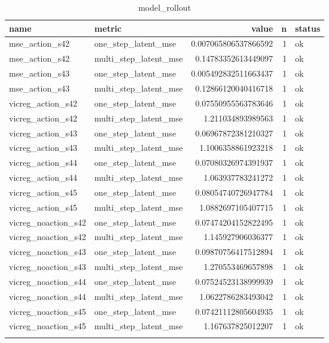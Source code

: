 \begin{table}
\centering
\begin{tabular}{llrrl}
name & metric & value & n & status \\
\hline
mse\_action\_s42 & one\_step\_latent\_mse & 0.007065806537866592 & 1 & ok \\
mse\_action\_s42 & multi\_step\_latent\_mse & 0.14783352613449097 & 1 & ok \\
mse\_action\_s43 & one\_step\_latent\_mse & 0.005492832511663437 & 1 & ok \\
mse\_action\_s43 & multi\_step\_latent\_mse & 0.12866120040416718 & 1 & ok \\
vicreg\_action\_s42 & one\_step\_latent\_mse & 0.07550955563783646 & 1 & ok \\
vicreg\_action\_s42 & multi\_step\_latent\_mse & 1.211034893989563 & 1 & ok \\
vicreg\_action\_s43 & one\_step\_latent\_mse & 0.06967872381210327 & 1 & ok \\
vicreg\_action\_s43 & multi\_step\_latent\_mse & 1.1006358861923218 & 1 & ok \\
vicreg\_action\_s44 & one\_step\_latent\_mse & 0.07080326974391937 & 1 & ok \\
vicreg\_action\_s44 & multi\_step\_latent\_mse & 1.063937783241272 & 1 & ok \\
vicreg\_action\_s45 & one\_step\_latent\_mse & 0.08054740726947784 & 1 & ok \\
vicreg\_action\_s45 & multi\_step\_latent\_mse & 1.0882697105407715 & 1 & ok \\
vicreg\_noaction\_s42 & one\_step\_latent\_mse & 0.07474204152822495 & 1 & ok \\
vicreg\_noaction\_s42 & multi\_step\_latent\_mse & 1.145927906036377 & 1 & ok \\
vicreg\_noaction\_s43 & one\_step\_latent\_mse & 0.09870756417512894 & 1 & ok \\
vicreg\_noaction\_s43 & multi\_step\_latent\_mse & 1.270553469657898 & 1 & ok \\
vicreg\_noaction\_s44 & one\_step\_latent\_mse & 0.07524523138999939 & 1 & ok \\
vicreg\_noaction\_s44 & multi\_step\_latent\_mse & 1.0622786283493042 & 1 & ok \\
vicreg\_noaction\_s45 & one\_step\_latent\_mse & 0.07421112805604935 & 1 & ok \\
vicreg\_noaction\_s45 & multi\_step\_latent\_mse & 1.167637825012207 & 1 & ok \\
\caption{model\_rollout}
\end{tabular}
\end{table}
